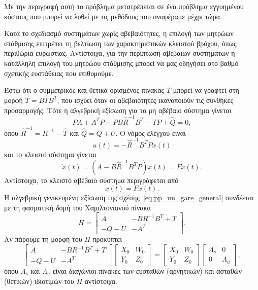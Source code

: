 Με την περιγραφή αυτή το πρόβλημα μετατρέπεται σε ένα πρόβλημα εγγυημένου
κόστους που μπορεί να λυθεί με τις μεθόδους που αναφέραμε μέχρι τώρα.

Κατά το σχεδιασμό συστημάτων χωρίς αβεβαιότητες, η επιλογή των μητρώων
στάθμισης επιτρέπει τη βελτίωση των χαρακτηριστικών κλειστού βρόχου, όπως
περιθώρια ευρωστίας. Αντίστοιχα, για την περίπτωση αβέβαιων συστημάτων η
κατάλληλη επιλογή του μητρώου στάθμισης μπορεί να μας οδηγήσει στο βαθμό
σχετικής ευστάθειας που επιθυμούμε.

Έστω ότι ο συμμετρικός και θετικά ορισμένος πίνακας \( T \) μπορεί να γραφτεί
στη μορφή \( T = B\hat{T}B^T \), που ισχύει όταν οι αβεβαιότητες ικανοποιούν
τις συνθήκες προσαρμογής. Τότε η αλγεβρική εξίσωση  για το μη
αβέβαιο σύστημα γίνεται
\begin{equation}\label{eq:pp_un_wei}
    PA + A^{T}P - PB\hat{R}^{-1}B^{T} - TP + \hat{Q} = 0,
\end{equation}
όπου \( \hat{R}^{-1} = R^{-1} - \hat{T} \) και \( \hat{Q} = Q + U \). Ο νόμος
ελέγχου είναι
\[
    u(t) = -\hat{R}^{-1}B^TPx(t)
\]
και το κλειστό σύστημα γίνεται
\begin{equation}\label{eq:pp_closed}
    \dot{x}(t) = (A - B\hat{R}^{-1}B^TP)x(t) = Fx(t).
\end{equation}
Αντίστοιχα, το κλειστό αβέβαιο σύστημα περιγράφεται από
\[
    \dot{x}(t) = Fx(t).
\]
Η αλγεβρική γενικευμένη εξίσωση  της
σχέσης~\eqref{eq:pp_un_gare_general} συνδέεται με τη φασματική δομή του
Χαμιλτονιανού πίνακα
\begin{equation*}
    H =
    \begin{bmatrix}
        A & -BR^{-1}B^T + T \\
        -Q - U & -A^T
    \end{bmatrix}.
\end{equation*}
Αν πάρουμε τη μορφή  του \( H \) προκύπτει
\begin{equation}\label{eq:pp_hamil}
    \begin{bmatrix}
        A & -BR^{-1}B^T + T \\
        -Q - U & -A^T
    \end{bmatrix}
    \begin{bmatrix}
        X_0 & W_0 \\
        Y_0 & Z_0
    \end{bmatrix} =
    \begin{bmatrix}
        X_0 & W_0 \\
        Y_0 & Z_0
    \end{bmatrix}
    \begin{bmatrix}
        \Lambda_s & 0 \\
        0 & \Lambda_u
    \end{bmatrix},
\end{equation}
όπου \( \Lambda_s \) και \( \Lambda_u \) είναι διαγώνιοι πίνακες των ευσταθών
(αρνητικών) και ασταθών (θετικών) ιδιοτιμών του \( H \) αντίστοιχα.


